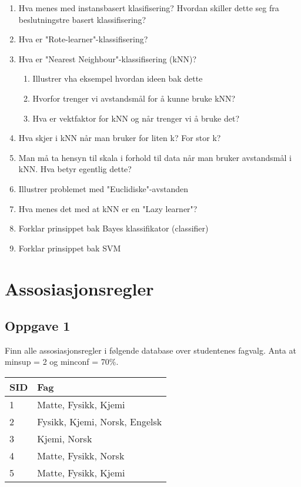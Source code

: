 		\begin{enumerate}
			\item Hva menes med instansbasert klasifisering? Hvordan skiller dette seg fra 
			beslutningstre basert klassifisering?
			\item Hva er "Rote-learner"-klassifisering?
			\item Hva er "Nearest Neighbour"-klassifisering (kNN)?
				\begin{enumerate}
					\item Illustrer vha eksempel hvordan ideen bak dette
					\item Hvorfor trenger vi avstandsmål for å kunne bruke kNN?
					\item Hva er vektfaktor for kNN og når trenger vi å bruke det?
				\end{enumerate}
			\item Hva skjer i kNN når man bruker for liten k? For stor k?
			\item Man må ta hensyn til skala i forhold til data når man bruker avstandsmål i kNN.
			Hva betyr egentlig dette?
			\item Illustrer problemet med "Euclidiske"-avstanden
			\item Hva menes det med at kNN er en "Lazy learner"?
			\item Forklar prinsippet bak Bayes klassifikator (classifier)
			\item Forklar prinsippet bak SVM
		\end{enumerate}

	\section{Assosiasjonsregler}
		
		\subsection*{Oppgave 1}

			Finn alle assosiasjonsregler i følgende database over studentenes fagvalg.
			Anta at minsup = 2 og minconf = 70\%.

			\begin{table}[H]
				\begin{tabular}{| l | l |}
					\hline
					{\bf SID} & {\bf Fag} \\ \hline
					1 & Matte, Fysikk, Kjemi \\ \hline
					2 & Fysikk, Kjemi, Norsk, Engelsk \\ \hline
					3 & Kjemi, Norsk \\ \hline
					4 & Matte, Fysikk, Norsk \\ \hline
					5 & Matte, Fysikk, Kjemi \\ \hline
				\end{tabular}
			\end{table}


